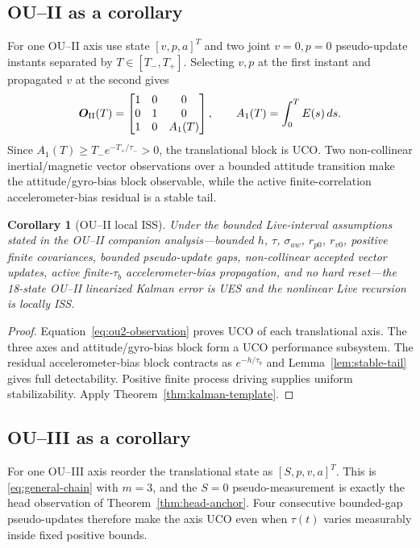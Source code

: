 \documentclass[conference]{IEEEtran}
\DeclareRobustCommand{\mat}[1]{\bm{#1}}
\newtheorem{corollary}{Corollary}
\theoremstyle{remark}
\begin{document}
\subsection{OU--II as a corollary}
For one OU--II axis use state $[v,p,a]^T$ and two joint $v=0,p=0$
pseudo-update instants separated by $T\in[T_-,T_+]$.  Selecting $v,p$ at the
first instant and propagated $v$ at the second gives
\begin{equation}
 \mat O_{\rm II}(T)=
 \begin{bmatrix}
  1&0&0\\0&1&0\\1&0&A_1(T)
 \end{bmatrix},\qquad
 A_1(T)=\int_0^T E(s)\,ds .
 \label{eq:ou2-observation}
\end{equation}
Since $A_1(T)\ge T_-e^{-T_+/\tau_-}>0$, the translational block is UCO.
Two non-collinear inertial/magnetic vector observations over a bounded attitude
transition make the attitude/gyro-bias block observable, while the active
finite-correlation accelerometer-bias residual is a stable tail.

\begin{corollary}[OU--II local ISS]
\label{cor:ou2}
Under the bounded Live-interval assumptions stated in the OU--II companion
analysis---bounded $h$, $\tau$, $\sigma_{aw}$, $r_{p0}$, $r_{v0}$, positive
finite covariances, bounded pseudo-update gaps, non-collinear accepted vector
updates, active finite-$\tau_b$ accelerometer-bias propagation, and no hard
reset---the 18-state OU--II linearized Kalman error is UES and the nonlinear
Live recursion is locally ISS.
\end{corollary}

\begin{proof}
Equation~\eqref{eq:ou2-observation} proves UCO of each translational axis.  The
three axes and attitude/gyro-bias block form a UCO performance subsystem.  The
residual accelerometer-bias block contracts as
$e^{-h/\tau_b}$ and Lemma~\ref{lem:stable-tail} gives full detectability.
Positive finite process driving supplies uniform stabilizability.  Apply
Theorem~\ref{thm:kalman-template}.
\end{proof}

\subsection{OU--III as a corollary}
For one OU--III axis reorder the translational state as $[S,p,v,a]^T$.
This is \eqref{eq:general-chain} with $m=3$, and the $S=0$ pseudo-measurement is
exactly the head observation of Theorem~\ref{thm:head-anchor}.  Four consecutive
bounded-gap pseudo-updates therefore make the axis UCO even when $\tau(t)$
varies measurably inside fixed positive bounds.
\end{document}
